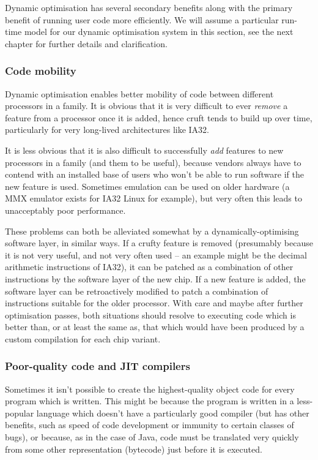 Dynamic optimisation has several secondary benefits along with the primary benefit of running user code more efficiently. We will assume a particular run-time model for our dynamic optimisation system in this section, see the next chapter for further details and clarification.

\subsubsection{Code mobility}

Dynamic optimisation enables better mobility of code between different processors in a family. It is obvious that it is very difficult to ever \emph{remove} a feature from a processor once it is added, hence cruft tends to build up over time, particularly for very long-lived architectures like IA32.

It is less obvious that it is also difficult to successfully \emph{add} features to new processors in a family (and them to be useful), because vendors always have to contend with an installed base of users who won't be able to run software if the new feature is used. Sometimes emulation can be used on older hardware (a MMX emulator exists for IA32 Linux for example), but very often this leads to unacceptably poor performance.

These problems can both be alleviated somewhat by a dynamically-optimising software layer, in similar ways. If a crufty feature is removed (presumably because it is not very useful, and not very often used -- an example might be the decimal arithmetic instructions of IA32), it can be patched as a combination of other instructions by the software layer of the new chip. If a new feature is added, the software layer can be retroactively modified to patch a combination of instructions suitable for the older processor. With care and maybe after further optimisation passes, both situations should resolve to executing code which is better than, or at least the same as, that which would have been produced by a custom compilation for each chip variant.


\subsubsection{Poor-quality code and JIT compilers}

Sometimes it isn't possible to create the highest-quality object code for every program which is written. This might be because the program is written in a less-popular language which doesn't have a particularly good compiler (but has other benefits, such as speed of code development or immunity to certain classes of bugs), or because, as in the case of Java, code must be translated very quickly from some other representation (bytecode) just before it is executed.

